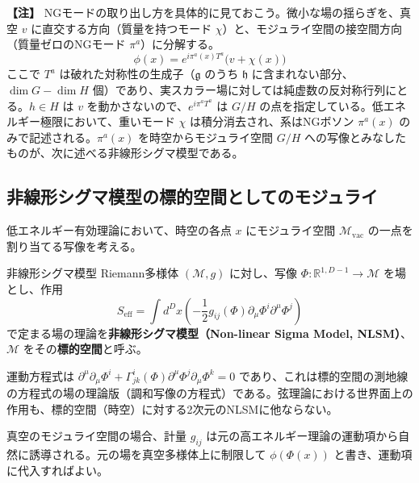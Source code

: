 \documentclass[uplatex, dvipdfmx, book]{jsbook}
\let\origsubsection\subsection
\let\origsubsubsection\subsubsection
\renewcommand{\section}{\origsubsection}
\renewcommand{\subsection}{\origsubsubsection}
\renewcommand{\subsubsection}{\paragraph}
\newenvironment{note}{\vspace{1ex}\par\footnotesize\noindent\textbf{【注】}}{\par\vspace{1ex}}
\begin{document}
\begin{note}
NGモードの取り出し方を具体的に見ておこう。微小な場の揺らぎを、真空 $v$ に直交する方向（質量を持つモード $\chi$）と、モジュライ空間の接空間方向（質量ゼロのNGモード $\pi^a$）に分解する。
\begin{equation*}
    \phi(x) = e^{i \pi^a(x) T^a} \bigl(v + \chi(x)\bigr)
\end{equation*}
ここで $T^a$ は破れた対称性の生成子（$\mathfrak{g}$ のうち $\mathfrak{h}$ に含まれない部分、$\dim G - \dim H$ 個）であり、実スカラー場に対しては純虚数の反対称行列にとる。$h \in H$ は $v$ を動かさないので、$e^{i\pi^a T^a}$ は $G/H$ の点を指定している。低エネルギー極限において、重いモード $\chi$ は積分消去され、系はNGボソン $\pi^a(x)$ のみで記述される。$\pi^a(x)$ を時空からモジュライ空間 $G/H$ への写像とみなしたものが、次に述べる非線形シグマ模型である。
\end{note}

\section{非線形シグマ模型の標的空間としてのモジュライ}

低エネルギー有効理論において、時空の各点 $x$ にモジュライ空間 $\mathcal{M}_{\text{vac}}$ の一点を割り当てる写像を考える。

\begin{mydef}{非線形シグマ模型}{}
Riemann多様体 $(\mathcal{M}, g)$ に対し、写像 $\Phi: \mathbb{R}^{1, D-1} \to \mathcal{M}$ を場とし、作用
\begin{equation*}
    S_{\text{eff}} = \int d^D x \left( - \frac{1}{2} g_{ij}(\Phi) \partial_\mu \Phi^i \partial^\mu \Phi^j \right)
\end{equation*}
で定まる場の理論を\textbf{非線形シグマ模型（Non-linear Sigma Model, NLSM）}、$\mathcal{M}$ をその\textbf{標的空間}と呼ぶ。
\end{mydef}

運動方程式は $\partial^\mu\partial_\mu \Phi^i + \Gamma^i_{jk}(\Phi)\partial^\mu\Phi^j\partial_\mu\Phi^k = 0$ であり、これは標的空間の測地線の方程式の場の理論版（調和写像の方程式）である。弦理論における世界面上の作用も、標的空間（時空）に対する2次元のNLSMに他ならない。

真空のモジュライ空間の場合、計量 $g_{ij}$ は元の高エネルギー理論の運動項から自然に誘導される。元の場を真空多様体上に制限して $\phi(\Phi(x))$ と書き、運動項に代入すればよい。
\end{document}
